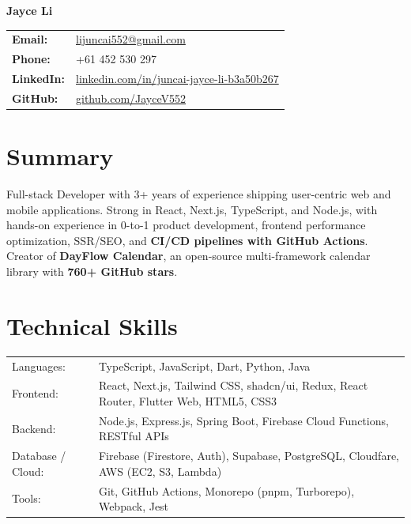 \documentclass[a4paper,11pt]{article}
\begin{document}
\color{maincolor}

\noindent
\begin{minipage}[c]{0.45\linewidth}
  {\Huge \textbf{Jayce Li}}
\end{minipage}\hfill
\begin{minipage}[c]{0.55\linewidth}
  \begin{tabular}{@{}l@{\hspace{8pt}}l@{}}
    \textbf{Email:} & \href{mailto:lijuncai552@gmail.com}{lijuncai552@gmail.com} \\
    \textbf{Phone:} & +61 452 530 297 \\
    \textbf{LinkedIn:} & \href{https://www.linkedin.com/in/juncai-jayce-li-b3a50b267/}{linkedin.com/in/juncai-jayce-li-b3a50b267} \\
    \textbf{GitHub:} & \href{https://github.com/JayceV552}{github.com/JayceV552} \\
  \end{tabular}
\end{minipage}
\vspace{-6pt}

\section{Summary}
Full-stack Developer with 3+ years of experience shipping user-centric web and mobile applications. Strong in React, Next.js, TypeScript, and Node.js, with hands-on experience in 0-to-1 product development, frontend performance optimization, SSR/SEO, and \textbf{CI/CD pipelines with GitHub Actions}. Creator of \textbf{DayFlow Calendar}, an open-source multi-framework calendar library with \textbf{760+ GitHub stars}.

\section{Technical Skills}
\begin{tabularx}{\linewidth}{@{}l X@{}}
Languages: & TypeScript, JavaScript, Dart, Python, Java \\
Frontend: & React, Next.js, Tailwind CSS, shadcn/ui, Redux, React Router, Flutter Web, HTML5, CSS3 \\
Backend: & Node.js, Express.js, Spring Boot, Firebase Cloud Functions, RESTful APIs \\
Database / Cloud: & Firebase (Firestore, Auth), Supabase, PostgreSQL, Cloudfare, AWS (EC2, S3, Lambda) \\
Tools: & Git, GitHub Actions, Monorepo (pnpm, Turborepo), Webpack, Jest \\
\end{tabularx}
\end{document}
